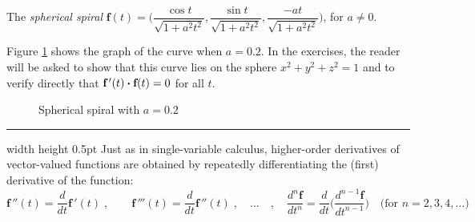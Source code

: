 \begin{exmp}\label{exmp:sphspiral}
 The \emph{spherical spiral}
 $\textbf{f}(t) = \biggl( \dfrac{\cos t}{\sqrt{1 + a^2 t^2}},\dfrac{\sin t}{\sqrt{1 + a^2 t^2}},
  \dfrac{-at}{\sqrt{1 + a^2 t^2}} \biggr)$, for $a \ne 0$.\vspace{1.5mm}
  \par\noindent Figure \ref{fig:sphspiral} shows the graph of the curve when $a = 0.2$. In the exercises, the reader will be asked to
  show that this curve lies on the sphere $x^2 + y^2 + z^2 = 1$ and to verify directly that
  $\textbf{f}\,'(t) \bm{\cdot} \textbf{f}(t) = 0$ for all $t$.\vspace{-18mm}
 \begin{figure}[h]
  \begin{center}
   
  \end{center}\vspace{-13.5mm}
 \caption[]{\quad Spherical spiral with $a = 0.2$}
 \label{fig:sphspiral}
 \end{figure}
\end{exmp}\vspace{-4mm}
\hrule width \textwidth height 0.5pt
\newpage
Just as in single-variable calculus, higher-order derivatives of vector-valued functions are obtained by repeatedly
differentiating the (first) derivative of the function:
\begin{displaymath}
 \textbf{f}\,''(t) = \dfrac{d}{dt} \textbf{f}\,'(t) \; , \qquad \textbf{f}\,'''(t) = \dfrac{d}{dt} \textbf{f}\,''(t) \;
 , \quad \ldots \quad , \quad \dfrac{d^{n}\textbf{f}}{dt^{n}} =
 \dfrac{d}{dt} \biggl( \dfrac{d^{n-1}\textbf{f}}{dt^{n-1}} \biggr) \text{~~~(for $n = 2, 3, 4,\ldots$)}
\end{displaymath}


